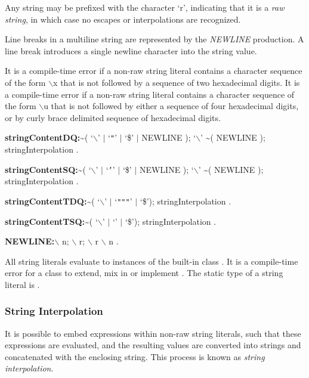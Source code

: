 \documentclass{article}
\begin{document}
\LMHash{}
Any string may be prefixed with the character `r', indicating that it is a {\em raw string}, in which case no escapes or interpolations are recognized.

\LMHash{}
Line breaks in a multiline string are represented by the {\em NEWLINE} production.
A line break introduces a single newline character into the string value.

\LMHash{}
It is a compile-time error if a non-raw string literal contains a character sequence of the form $\backslash$x that is not followed by a sequence of two hexadecimal digits.
It is a compile-time error if a non-raw string literal contains a character sequence of the form $\backslash$u that is not followed by either a sequence of four hexadecimal digits, or by curly brace delimited sequence of hexadecimal digits.

\begin{grammar}
{\bf stringContentDQ:}\~{}( `$\backslash$' $|$ `{\escapegrammar \texttt{"}}' $|$ `\$' $|$ NEWLINE );
  `$\backslash$' \~{}( NEWLINE );
  stringInterpolation
  .

{\bf stringContentSQ:}\~{}( `$\backslash$' $|$ `{\escapegrammar \texttt{'}}' $|$ `\$' $|$ NEWLINE );
  `$\backslash$' \~{}( NEWLINE );
  stringInterpolation
  .

{\bf stringContentTDQ:}\~{}( `$\backslash$' $|$ `{\escapegrammar \texttt{"""}}' $|$ `\$');
  stringInterpolation
  .

{\bf stringContentTSQ:}\~{}( `$\backslash$' $|$ `{\escapegrammar {}}' $|$ `\$');
  stringInterpolation
  .

{\bf NEWLINE:}$\backslash$ n;
  $\backslash$ r;
  $\backslash$ r $\backslash$ n
  .
\end{grammar}

\LMHash{}
All string literals evaluate to instances of the built-in class .
It is a compile-time error for a class to extend, mix in or implement .
The static type of a string literal is .


\subsubsection{String Interpolation}

\LMHash{}
It is possible to embed expressions within non-raw string literals, such that these expressions are evaluated, and the resulting values are converted into strings and concatenated with the enclosing string.
This process is known as {\em string interpolation}.
\end{document}
